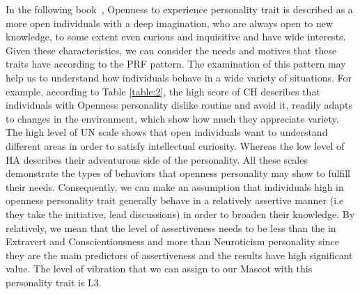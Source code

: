 \documentclass[12pt]{article}
\begin{document}
In the following book~\cite{matthews2003personality}, Openness to experience personality trait is described as a more open individuals with a deep imagination, who are always open to new knowledge, to some extent even curious and inquisitive and have wide interests. Given these characteristics, we can consider the needs and motives that these traits have according to the PRF pattern. The examination of this pattern may help us to understand how individuals behave in a wide variety of situations. 
For example, according to Table \ref{table:2}, the high score of CH describes that individuals with Openness personality dislike routine and avoid it, readily adapts to changes in the environment, which show how much they appreciate variety. The high level of UN scale shows that open individuals want to understand different areas in order to satisfy intellectual curiosity. Whereas the low level of HA describes their adventurous side of the personality. All these scales demonstrate the types of behaviors that openness personality may show to fulfill their needs. Consequently, we can make an assumption that individuals high in openness personality trait generally behave in a relatively assertive manner (i.e they take the initiative, lead discussions) in order to broaden their knowledge. By relatively, we mean that the level of assertiveness needs to be less than the in Extravert and Conscientiousness and more than Neuroticism personality since they are the main predictors of assertiveness and the results have high significant value. 
The level of vibration that we can assign to our Mascot with this personality trait is L3. 
\end{document}
